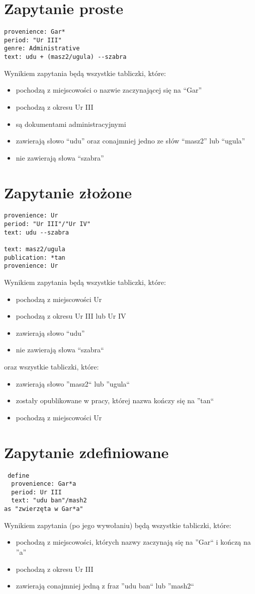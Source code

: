 \section{Zapytanie proste}
\begin{verbatim}
provenience: Gar*
period: "Ur III"
genre: Administrative
text: udu + (masz2/ugula) --szabra
\end{verbatim}
Wynikiem zapytania będą wszystkie tabliczki, które:
\begin{itemize}
\item pochodzą z miejscowości o nazwie zaczynającej się na ``Gar''
\item pochodzą z okresu Ur III
\item są dokumentami administracyjnymi
\item zawierają słowo ``udu'' oraz conajmniej jedno ze słów ``masz2'' lub ``ugula''
\item nie zawierają słowa ``szabra''
\end{itemize}


\section{Zapytanie złożone}
\begin{verbatim}
provenience: Ur
period: "Ur III"/"Ur IV"
text: udu --szabra

text: masz2/ugula
publication: *tan
provenience: Ur
\end{verbatim}
Wynikiem zapytania będą wszystkie tabliczki, które:
\begin{itemize}
 \item pochodzą z miejscowości Ur
 \item pochodzą z okresu Ur III lub Ur IV
 \item zawierają słowo ``udu''
 \item nie zawierają słowa ``szabra``
\end{itemize}
oraz wszystkie tabliczki, które:
\begin{itemize}
 \item zawierają słowo ''masz2`` lub ''ugula``
 \item zostały opublikowane w pracy, której nazwa kończy się na ''tan``
 \item pochodzą z miejscowości Ur
\end{itemize}


\section{Zapytanie zdefiniowane}
\begin{verbatim}
 define
  provenience: Gar*a
  period: Ur III
  text: "udu ban"/mash2
as "zwierzęta w Gar*a"
\end{verbatim}
Wynikiem zapytania (po jego wywołaniu) będą wszystkie tabliczki, które:
\begin{itemize}
\item pochodzą z miejscowości, których nazwy zaczynają się na ''Gar`` i kończą na ''a''
\item pochodzą z okresu Ur III
\item zawierają conajmniej jedną z fraz ''udu ban`` lub ''mash2``
\end{itemize}


